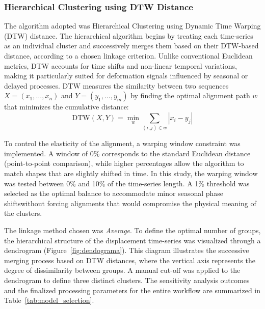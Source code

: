 \documentclass[11pt,a4paper]{article}
\begin{document}
\subsubsection{Hierarchical Clustering using DTW Distance}

The algorithm adopted was Hierarchical Clustering using Dynamic Time Warping (DTW) distance. The hierarchical algorithm begins by treating each time-series as an individual cluster and successively merges them based on their DTW-based distance, according to a chosen linkage criterion. Unlike conventional Euclidean metrics, DTW accounts for time shifts and non-linear temporal variations, making it particularly suited for deformation signals influenced by seasonal or delayed processes. DTW measures the similarity between two sequences $X=(x_1, \dots, x_n)$ and $Y=(y_1, \dots, y_m)$ by finding the optimal alignment path $w$ that minimizes the cumulative distance:\begin{equation}\text{DTW}(X,Y) = \min_{w} \sum_{(i,j) \in w} | x_i - y_j |\label{eq:dtw}\end{equation} 

To control the elasticity of the alignment, a warping window constraint was implemented. A window of 0\% corresponds to the standard Euclidean distance (point-to-point comparison), while higher percentages allow the algorithm to match shapes that are slightly shifted in time. In this study, the warping window was tested between 0\% and 10\% of the time-series length. A 1\% threshold was selected as the optimal balance to accommodate minor seasonal phase shiftswithout forcing alignments that would compromise the physical meaning of the clusters.

The linkage method chosen was \textit{Average}. To define the optimal number of groups, the hierarchical structure of the displacement time-series was visualized through a dendrogram (Figure~\ref{fig:dendograma}). This diagram illustrates the successive merging process based on DTW distances, where the vertical axis represents the degree of dissimilarity between groups. A manual cut-off was applied to the dendrogram to define three distinct clusters. The sensitivity analysis outcomes and the finalized processing parameters for the entire workflow are summarized in Table~\ref{tab:model_selection}.
\end{document}
